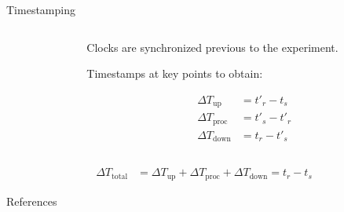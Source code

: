 \documentclass[aspectratio=1610]{beamer}
\begin{document}
\begin{frame}{Timestamping}
    \begin{columns}[onlytextwidth]
        \begin{column}{.5\linewidth}
            \footnotesize%
            \raggedright%
            
        \end{column}%
        \begin{column}{.5\linewidth}
            Clocks are synchronized previous to the experiment.

            \vspace{\baselineskip}%
            Timestamps at key points to obtain:

            \begin{align}
                {\Delta}T_\text{up} &= t'_{r} - t_{s}\\
                {\Delta}T_\text{proc} &= t'_{s} - t'_{r}\\
                {\Delta}T_\text{down} &= t_{r} - t'_{s}
            \end{align}
        \end{column}%
    \end{columns}
    \begin{align}
        {\Delta}T_\text{total} &= {\Delta}T_\text{up} + {\Delta}T_\text{proc} + {\Delta}T_\text{down} = t_{r} - t_{s}
    \end{align}
\end{frame}

\begin{frame}[allowframebreaks, t]{References}
    \nocite{*}
    \printbibliography%
\end{frame}
\end{document}
